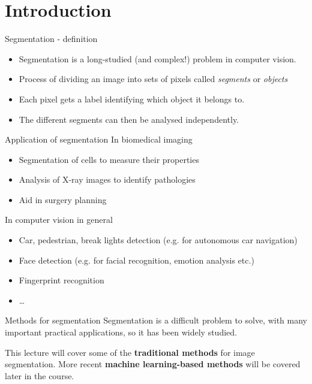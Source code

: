 \documentclass[9pt, aspectratio=169]{beamer}
\begin{document}
\begin{frame}
\begin{columns}
\begin{column}{0.2\textwidth}
        \end{column}
    \end{columns}
\end{frame}

\section{Introduction}

\begin{frame}
    {Segmentation - definition}
    \begin{itemize}
        \item Segmentation is a long-studied (and complex!) problem in computer vision.
        \item Process of dividing an image into sets of pixels called \textit{segments} or \textit{objects}
        \item Each pixel gets a label identifying which object it belongs to.
        \item The different segments can then be analysed independently.
    \end{itemize}
\end{frame}

\begin{frame}
    {Application of segmentation}
    In biomedical imaging
    \begin{itemize}
        \item Segmentation of cells to measure their properties
        \item Analysis of X-ray images to identify pathologies
        \item Aid in surgery planning
    \end{itemize}
    \pause
    In computer vision in general
    \begin{itemize}
        \item Car, pedestrian, break lights detection (e.g. for autonomous car navigation)
        \item Face detection (e.g. for facial recognition, emotion analysis etc.)
        \item Fingerprint recognition
        \item \dots
    \end{itemize}
\end{frame}

\begin{frame}
    {Methods for segmentation}
    Segmentation is a difficult problem to solve, with many important practical applications, so it has been widely studied.

    \pause

    This lecture will cover some of the \textbf{traditional methods} for image segmentation. More recent \textbf{machine learning-based methods} will be covered later in the course.
\end{frame}
\end{document}
